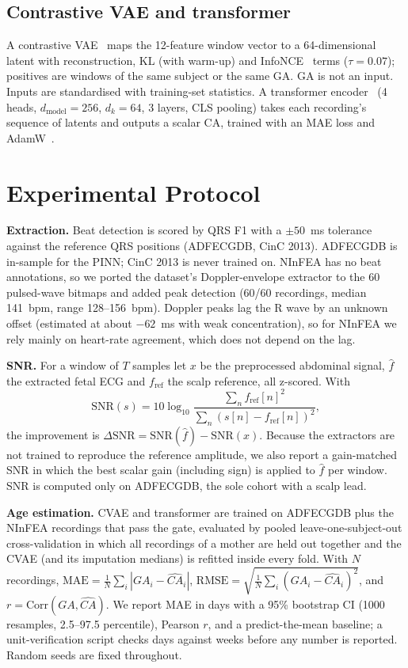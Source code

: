 \documentclass[journal]{IEEEtran}
\begin{document}
\subsection{Contrastive VAE and transformer}
A contrastive VAE~\cite{kingma2014} maps the 12-feature window vector to a 64-dimensional latent with reconstruction, KL (with warm-up) and InfoNCE~\cite{oord2018} terms ($\tau=0.07$); positives are windows of the same subject or the same GA. GA is not an input. Inputs are standardised with training-set statistics. A transformer encoder~\cite{vaswani2017} (4 heads, $d_{\mathrm{model}}=256$, $d_k=64$, 3 layers, CLS pooling) takes each recording's sequence of latents and outputs a scalar CA, trained with an MAE loss and AdamW~\cite{loshchilov2019}.

\section{Experimental Protocol}
\textbf{Extraction.} Beat detection is scored by QRS F1 with a $\pm50$~ms tolerance against the reference QRS positions (ADFECGDB, CinC 2013). ADFECGDB is in-sample for the PINN; CinC 2013 is never trained on. NInFEA has no beat annotations, so we ported the dataset's Doppler-envelope extractor to the 60 pulsed-wave bitmaps and added peak detection (60/60 recordings, median 141~bpm, range 128--156~bpm). Doppler peaks lag the R wave by an unknown offset (estimated at about $-62$~ms with weak concentration), so for NInFEA we rely mainly on heart-rate agreement, which does not depend on the lag.

\textbf{SNR.} For a window of $T$ samples let $x$ be the preprocessed abdominal signal, $\hat f$ the extracted fetal ECG and $f_{\mathrm{ref}}$ the scalp reference, all z-scored. With
\begin{equation}
\mathrm{SNR}(s)=10\log_{10}\frac{\sum_n f_{\mathrm{ref}}[n]^2}{\sum_n (s[n]-f_{\mathrm{ref}}[n])^2},
\end{equation}
the improvement is $\Delta\mathrm{SNR}=\mathrm{SNR}(\hat f)-\mathrm{SNR}(x)$. Because the extractors are not trained to reproduce the reference amplitude, we also report a gain-matched SNR in which the best scalar gain (including sign) is applied to $\hat f$ per window. SNR is computed only on ADFECGDB, the sole cohort with a scalp lead.

\textbf{Age estimation.} CVAE and transformer are trained on ADFECGDB plus the NInFEA recordings that pass the gate, evaluated by pooled leave-one-subject-out cross-validation in which all recordings of a mother are held out together and the CVAE (and its imputation medians) is refitted inside every fold. With $N$ recordings, $\mathrm{MAE}=\frac1N\sum_i|GA_i-\widehat{CA}_i|$, $\mathrm{RMSE}=\sqrt{\frac1N\sum_i(GA_i-\widehat{CA}_i)^2}$, and $r=\mathrm{Corr}(GA,\widehat{CA})$. We report MAE in days with a 95\% bootstrap CI (1000 resamples, 2.5--97.5 percentile), Pearson $r$, and a predict-the-mean baseline; a unit-verification script checks days against weeks before any number is reported. Random seeds are fixed throughout.
\end{document}
